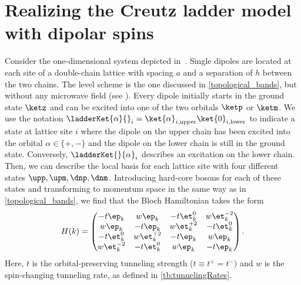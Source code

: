 \chapter[Realizing the Creutz ladder model with dipolar spins]{Realizing the Creutz ladder model\texorpdfstring{\\}{ }with dipolar spins}
\label{creutz_ladder}


Consider the one-dimensional system depicted in~.
Single dipoles are located at each site of a double-chain lattice with spacing $a$ and a separation of $h$ between the two chains.
The level scheme is the one discussed in \cref{topological_bands}, but without any microwave field (see ). Every dipole initially starts in the ground state $\ketz$ and can be excited into one of the two orbitals $\ketp$ or $\ketm$.
We use the notation $\ladderKet{\alpha}{}_i = \ket{\alpha}_{i,\text{upper}} \ket{0}_{i,\text{lower}}$ to indicate a state at lattice site $i$ where the dipole on the upper chain has been excited into the orbital $\alpha \in \{+, -\}$ and the dipole on the lower chain is still in the ground state.
Conversely, $\ladderKet{}{\alpha}_i$ describes an excitation on the lower chain.
Then, we can describe the local basis for each lattice site with four different states $\upp, \upm, \dnp, \dnm$.
Introducing hard-core bosons for each of these states and transforming to momentum space in the same way as in \cref{topological_bands}, we find that the Bloch Hamiltonian takes the form
\begin{align}
    H(k) =
    \begin{pmatrix}
        -t \ep_k  & w \ep_k & -t \et^0_k & w \et^{-2}_k \\
        w \ep_k & -t \ep_k  & w \et^{+2}_k & -t \et^0_k \\
        -t \et^0_{k} & w \et^{+2}_{k}  & -t \ep_k  & w \ep_k \\
        w \et^{-2}_{k} & -t \et^0_{k} & w \ep_k & -t \ep_k
    \end{pmatrix}.
\end{align}
Here, $t$ is the orbital-preserving tunneling strength ($t \equiv t^+ = t^-$) and $w$ is the spin-changing tunneling rate, as defined in \cref{tb:tunnelingRates}.
